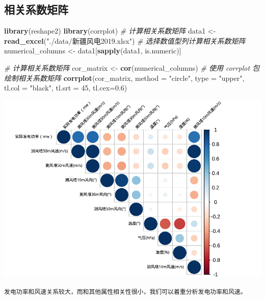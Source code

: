 \documentclass[
]{ctexart}
\newenvironment{Shaded}{\begin{snugshade}}{\end{snugshade}}
\newcommand{\AttributeTok}[1]{\textcolor[rgb]{0.13,0.29,0.53}{#1}}
\newcommand{\CommentTok}[1]{\textcolor[rgb]{0.56,0.35,0.01}{\textit{#1}}}
\newcommand{\DecValTok}[1]{\textcolor[rgb]{0.00,0.00,0.81}{#1}}
\newcommand{\FloatTok}[1]{\textcolor[rgb]{0.00,0.00,0.81}{#1}}
\newcommand{\FunctionTok}[1]{\textcolor[rgb]{0.13,0.29,0.53}{\textbf{#1}}}
\newcommand{\NormalTok}[1]{#1}
\newcommand{\OtherTok}[1]{\textcolor[rgb]{0.56,0.35,0.01}{#1}}
\newcommand{\StringTok}[1]{\textcolor[rgb]{0.31,0.60,0.02}{#1}}
\begin{document}
\subsection{相关系数矩阵}\label{ux76f8ux5173ux7cfbux6570ux77e9ux9635}

\begin{Shaded}
\begin{Highlighting}[]
\FunctionTok{library}\NormalTok{(reshape2)}
\FunctionTok{library}\NormalTok{(corrplot)}
\CommentTok{\# 计算相关系数矩阵}
\NormalTok{data1 }\OtherTok{\textless{}{-}} \FunctionTok{read\_excel}\NormalTok{(}\StringTok{"./data/新疆风电2019.xlsx"}\NormalTok{)}
\CommentTok{\# 选择数值型列计算相关系数矩阵}
\NormalTok{numerical\_columns }\OtherTok{\textless{}{-}}\NormalTok{ data1[}\FunctionTok{sapply}\NormalTok{(data1, is.numeric)]}

\CommentTok{\# 计算相关系数矩阵}
\NormalTok{cor\_matrix }\OtherTok{\textless{}{-}} \FunctionTok{cor}\NormalTok{(numerical\_columns)}
\CommentTok{\# 使用 corrplot 包绘制相关系数矩阵}
\FunctionTok{corrplot}\NormalTok{(cor\_matrix, }\AttributeTok{method =} \StringTok{"circle"}\NormalTok{, }\AttributeTok{type =} \StringTok{"upper"}\NormalTok{, }\AttributeTok{tl.col =} \StringTok{"black"}\NormalTok{, }\AttributeTok{tl.srt =} \DecValTok{45}\NormalTok{, }\AttributeTok{tl.cex=}\FloatTok{0.6}\NormalTok{)}
\end{Highlighting}
\end{Shaded}

\includegraphics{1_files/figure-latex/unnamed-chunk-4-1.pdf}

\begin{verbatim}
发电功率和风速关系较大，而和其他属性相关性很小，我们可以着重分析发电功率和风速。
\end{verbatim}
\end{document}
